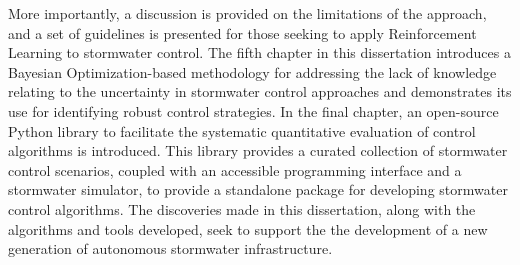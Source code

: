More importantly, a discussion is provided on the limitations of the approach, and a set of guidelines is presented for those seeking to apply Reinforcement Learning to stormwater control.
The fifth chapter in this dissertation introduces a Bayesian Optimization-based methodology for addressing the lack of knowledge relating to the uncertainty in stormwater control approaches and demonstrates its use for identifying robust control strategies.
In the final chapter, an open-source Python library to facilitate the systematic quantitative evaluation of control algorithms is introduced.
This library provides a curated collection of stormwater control scenarios, coupled with an accessible programming interface and a stormwater simulator, to provide a standalone package for developing stormwater control algorithms.
The discoveries made in this dissertation, along with the algorithms and tools developed, seek to support the the development of a new generation of autonomous stormwater infrastructure.
\endgroup

\vfill


